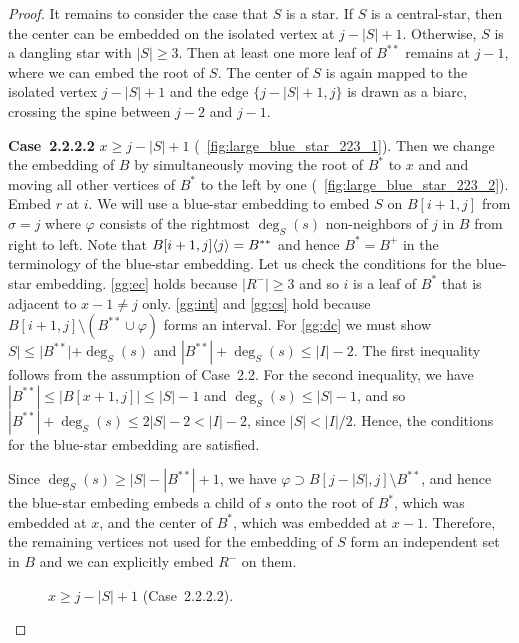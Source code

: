\documentclass[11pt,a4paper,colorlinks=true,urlcolor=blue,citecolor=red]{article}
\theoremstyle{plain}
\newcommand{\case}[1]{\par\vspace{.5\baselineskip}\noindent\textbf{\sffamily Case~#1}}
\begin{document}
\begin{proof}
  It remains to consider the case that $S$ is a star. If $S$ is a
  central-star, then the center can be embedded on the isolated vertex
  at $j-|S|+1$. Otherwise, $S$ is a dangling star with $|S|\ge 3$. Then
  at least one more leaf of $B^{**}$ remains at $j-1$, where we can
  embed the root of $S$. The center of $S$ is again mapped to the
  isolated vertex $j-|S|+1$ and the edge $\{j-|S|+1,j\}$ is drawn as a
  biarc, crossing the spine between $j-2$ and $j-1$.

  \case{2.2.2.2} $x\ge j-|S|+1$
  (\figurename~\ref{fig:large_blue_star_223_1}). Then we change the
  embedding of $B$ by simultaneously moving the root of $B^*$ to $x$ and
  and moving all other vertices of $B^*$ to the left by one
  (\figurename~\ref{fig:large_blue_star_223_2}). Embed $r$ at $i$. We
  will use a blue-star embedding to embed $S$ on $B[i+1,j]$ from
  $\sigma=j$ where $\varphi$ consists of the rightmost $\deg_S(s)$
  non-neighbors of $j$ in $B$ from right to left. Note that
  $B{[i+1,j]}\langle{j}\rangle=B^{**}$ and hence $B^*=B^+$ in the terminology
  of the blue-star embedding. Let us check the conditions for the
  blue-star embedding. \ref{gg:ec} holds because $|R^-|\ge 3$ and so
  $i$ is a leaf of $B^*$ that is adjacent to $x-1\ne j$ only.
  \ref{gg:int} and \ref{gg:cs} hold because
  $B[i+1,j]\setminus(B^{**}\cup\varphi)$ forms an interval. For \ref{gg:dc}
  we must show $S|\leq|B^{**}|+\deg_S(s)$ and
  $|B^{**}|+\deg_S(s)\leq|I|-2$. The first inequality follows from the
  assumption of Case~2.2. For the second inequality, we have
  $|B^{**}|\leq |B[x+1,j]|\leq|S|-1$ and $\deg_S(s)\leq|S|-1$, and so
  $|B^{**}|+\deg_S(s)\leq 2|S|-2<|I|-2$, since $|S|<|I|/2$. Hence, the
  conditions for the blue-star embedding are satisfied.

  Since $\deg_S(s)\geq|S|-|B^{**}|+1$, we have $\varphi\supset
  B[j-|S|,j]\setminus B^{**}$, and hence the blue-star embeding embeds
  a child of $s$ onto the root of $B^{*}$, which was embedded at $x$,
  and the center of $B^{*}$, which was embedded at $x-1$. Therefore,
  the remaining vertices not used for the embedding of $S$ form an
  independent set in $B$ and we can explicitly embed $R^-$ on them.
\begin{figure}[htbp]
    \centering\hfil {}\hfil
    \hfil
    \caption{$x\ge j-|S|+1$
      (Case~2.2.2.2).\label{fig:large_blue_star_223}}
  \end{figure}



\end{proof}
\end{document}
